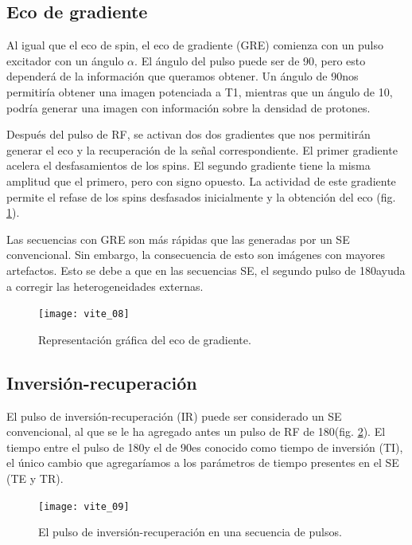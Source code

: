 \subsection{Eco de gradiente }
Al igual que el eco de spin, el eco de gradiente (GRE) comienza con un pulso excitador con un ángulo $\alpha$. El ángulo del pulso puede ser de 90\degrees, pero esto dependerá de la información que queramos obtener. Un ángulo de 90\degrees nos permitiría obtener una imagen potenciada a T1, mientras que un ángulo de 10\degrees, podría generar una imagen con información sobre la densidad de protones. 

Después del pulso de RF, se activan dos dos gradientes que nos permitirán generar el eco y la recuperación de la señal correspondiente. El primer gradiente acelera el desfasamientos de los spins. El segundo gradiente tiene la misma amplitud que el primero, pero con signo opuesto. La actividad de este gradiente permite el refase de los spins desfasados inicialmente y la obtención del eco (fig. \ref{fig:seq_GRE}).

Las secuencias con GRE son más rápidas que las generadas por un SE convencional. Sin embargo, la consecuencia de esto son imágenes con mayores artefactos. Esto se debe a que en las secuencias SE, el segundo pulso de 180\degrees ayuda a corregir las heterogeneidades externas. 


\begin{figure}[htb]
\begin{figg}
   \texttt{[image: vite\_08]}
   \caption{Representación gráfica del eco de gradiente.}
 \label{fig:seq_GRE}
 \end{figg}
\end{figure}


\subsection{Inversión-recuperación}
El pulso de inversión-recuperación (IR) puede ser considerado un SE convencional, al que se le ha agregado antes un pulso de RF de 180\degrees (fig. \ref{fig:seq_IR}). El tiempo entre el pulso de 180\degrees y el de 90\degrees es conocido como tiempo de inversión (TI), el único cambio que agregaríamos a los parámetros de tiempo presentes en el SE (TE y TR). 


\begin{figure}[htb]
\begin{figg}
   \texttt{[image: vite\_09]}
   \caption{El pulso de inversión-recuperación en una secuencia de pulsos. }
 \label{fig:seq_IR}
 \end{figg}
\end{figure}




